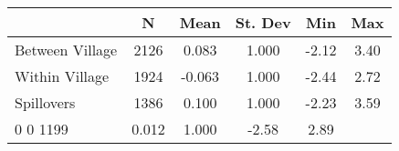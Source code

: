 \begin{tabular}{l*{5}{c}}\hline&\multicolumn{1}{c}{N}&\multicolumn{1}{c}{Mean}&\multicolumn{1}{c}{St. Dev}&\multicolumn{1}{c}{Min}&\multicolumn{1}{c}{Max}\\ \hline 
Between Village & 2126 & 0.083 & 1.000 & -2.12 & 3.40 \\
Within Village & 1924 & -0.063 & 1.000 & -2.44 & 2.72 \\
Spillovers & 1386 & 0.100 & 1.000 & -2.23 & 3.59 \\
0 0 1199 & 0.012 & 1.000 & -2.58 & 2.89 \\
\hline \end{tabular}

